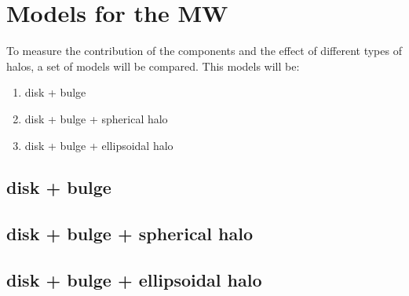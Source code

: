 \section{Models for the MW}

To measure the contribution of the components and the effect of different types of halos, a set of models will be compared. This models will be:

\begin{enumerate}
    \item disk + bulge
    \item disk + bulge + spherical halo
    \item disk + bulge + ellipsoidal halo
\end{enumerate}

\subsection{disk + bulge}

\subsection{disk + bulge + spherical halo}

\subsection{disk + bulge + ellipsoidal halo}

